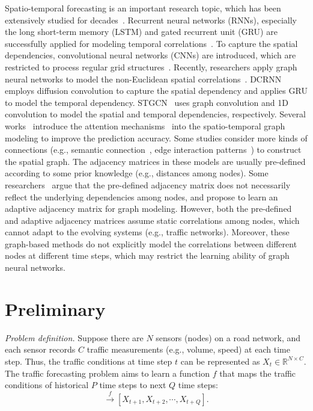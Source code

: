 \documentclass[10pt,journal,compsoc]{IEEEtran}
\begin{document}
Spatio-temporal forecasting is an important research topic, which has been extensively studied for decades~\cite{Yin-et-al:arXiv2020,Sun-et-al:TKDE2020,Gu-et-al:TKDE2020,Jiang-et-al:TKDE2021,Guo-et-al:TKDE2021}. Recurrent neural networks (RNNs), especially the long short-term memory (LSTM) and gated recurrent unit (GRU) are successfully applied for modeling temporal correlations~\cite{Ma-et-al:TRC2015}. To capture the spatial dependencies, convolutional neural networks (CNNs) are introduced, which are restricted to process regular grid structures~\cite{Zhang-et-al:AAAI2017,Yao-et-al:AAAI2018,Yao-et-al:AAAI2019,Zheng-et-al:TITS2020,Zhang-et-al:TKDE2020}. Recently, researchers apply graph neural networks to model the non-Euclidean spatial correlations~\cite{Ye-et-al:arXiv2020}. DCRNN~\cite{Li-et-al:ICLR2018} employs diffusion convolution to capture the spatial dependency and applies GRU to model the temporal dependency. STGCN~\cite{Yu-et-al:IJCAI2018} uses graph convolution and 1D convolution to model the spatial and temporal dependencies, respectively. Several works~\cite{Guo-et-al:AAAI2019,Zheng-et-al:AAAI2020,Wang-et-al:WWW2020} introduce the attention mechanisms~\cite{Vaswani-et-al:NIPS2017} into the spatio-temporal graph modeling to improve the prediction accuracy. Some studies consider more kinds of connections (e.g., semantic connection~\cite{Wang-et-al:KDD2019}, edge interaction patterns~\cite{Chen-et-al:AAAI2020}) to construct the spatial graph. The adjacency matrices in these models are usually pre-defined according to some prior knowledge (e.g., distances among nodes). Some researchers~\cite{Wu-et-al:IJCAI2019,Bai-et-al:NIPS2020} argue that the pre-defined adjacency matrix does not necessarily reflect the underlying dependencies among nodes, and propose to learn an adaptive adjacency matrix for graph modeling. However, both the pre-defined and adaptive adjacency matrices assume static correlations among nodes, which cannot adapt to the evolving systems (e.g., traffic networks). Moreover, these graph-based methods do not explicitly model the correlations between different nodes at different time steps, which may restrict the learning ability of graph neural networks.  

\section{Preliminary} \label{Preliminary}

\textit{Problem definition.} Suppose there are $ N $ sensors (nodes) on a road network, and each sensor records $ C $ traffic measurements (e.g., volume, speed) at each time step. Thus, the traffic conditions at time step $ t $ can be represented as $ X_{t} \in \mathbb{R}^{N \times C} $.  The traffic forecasting problem aims to learn a function $ f $ that maps the traffic conditions of historical $ P $ time steps to next $ Q $ time steps:
%
\begin{equation}
[X_{t-P+1},X_{t-P+2},\cdots,X_{t}]\stackrel{f}{\longrightarrow}[X_{t+1},X_{t+2},\cdots,X_{t+Q}].
\label{eq1}
\end{equation}
%
\end{document}
